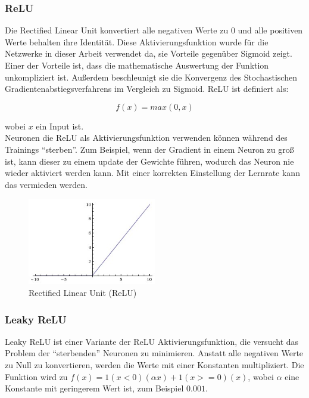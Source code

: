 \subsubsection{ReLU}
Die Rectified Linear Unit konvertiert alle negativen Werte zu 0 und alle positiven Werte behalten ihre Identität. Diese Aktivierungsfunktion
wurde für die Netzwerke in dieser Arbeit verwendet da, sie Vorteile gegenüber Sigmoid zeigt. Einer der Vorteile ist, dass die mathematische
Auswertung der Funktion unkompliziert ist. Außerdem beschleunigt sie die Konvergenz des Stochastischen Gradientenabstiegsverfahrens im Vergleich zu Sigmoid.
ReLU ist definiert als:

\begin{equation}
  f(x) = max(0, x)
\end{equation}

wobei $x$ ein Input ist.
\\
Neuronen die ReLU als Aktivierungsfunktion verwenden können während des Trainings ``sterben''. Zum Beispiel, wenn der Gradient in einem Neuron
zu groß ist, kann dieser zu einem update der Gewichte führen, wodurch das Neuron nie wieder aktiviert werden kann. Mit einer korrekten Einstellung der
Lernrate kann das vermieden werden. \cite{cs231-neural-networks}

\begin{figure}[H]
  \centering
  \includegraphics[width=0.5\textwidth]{resources/nn/relu.jpeg}
  \caption{
    Rectified Linear Unit (ReLU) 
    \cite{neuron-model}
  }
  \label{image:relu}
\end{figure}

\subsubsection{Leaky ReLU}
Leaky ReLU ist einer Variante der ReLU Aktivierungsfunktion, die versucht das Problem der ``sterbenden'' Neuronen zu minimieren. Anstatt alle negativen Werte
zu Null zu konvertieren, werden die Werte mit einer Konstanten multipliziert. Die Funktion wird zu $ f(x) = 1(x < 0)(\alpha x) + 1(x >= 0)(x)$,
wobei $ \alpha $ eine Konstante mit geringerem Wert ist, zum Beispiel $ 0.001 $.


